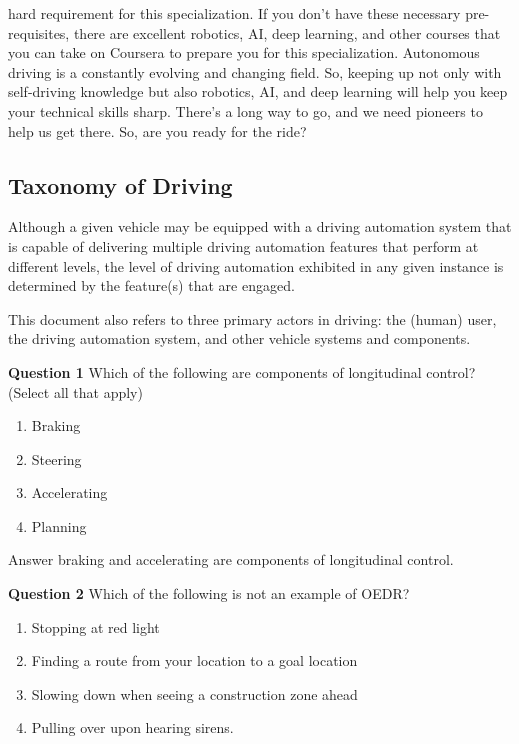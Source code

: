 hard requirement for this specialization. If you don't have these necessary pre-requisites, there are excellent robotics, AI, deep learning, and other courses that you can take on Coursera to prepare you for this specialization. Autonomous driving is a constantly evolving and changing field. So, keeping up not only with self-driving knowledge but also robotics, AI, and deep learning will help you keep your technical skills sharp. 
There's a long way to go, and we need pioneers to help us get there. So, are you ready for the ride?





\subsection{Taxonomy of Driving}


\begin{framed}

Although a given vehicle may be equipped with a driving automation system that is capable of delivering multiple driving automation 
features that perform at different levels, the level of driving automation exhibited in any given instance is determined by the feature(s) that are engaged.
\end{framed}


\begin{framed}
This document also refers to three primary actors in driving: the (human) user, the driving automation system, and other vehicle systems and components. 
\end{framed}




\textbf{Question 1}
Which of the following are components of longitudinal control? (Select all that apply)


\begin{enumerate}
\item Braking
\item Steering
\item Accelerating
\item Planning
\end{enumerate}

Answer braking and accelerating are components of longitudinal control.

\textbf{Question 2}
Which of the following is not an example of OEDR?


\begin{enumerate}
\item Stopping at red light
\item Finding a route from your location to a goal location
\item Slowing down when seeing a construction zone ahead
\item Pulling over upon hearing sirens.
\end{enumerate}


